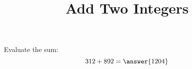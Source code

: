 \documentclass{ximera}
\title{Add Two Integers}
\begin{document}
\maketitle
Evaluate the sum:
$$
312+892=\answer{1204}
$$
\end{document}
